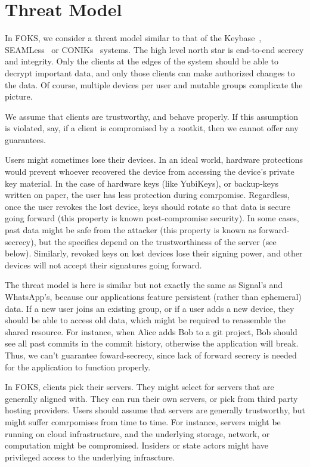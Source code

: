 
\section{Threat Model}
\label{sec:threatmodel}

In FOKS, we consider a threat model similar to that of the Keybase~\cite{keybase},
SEAMLess~\cite{chase2019seemless} or CONIKs~\cite{melara2015coniks} systems.
The high level north star is end-to-end secrecy and integrity. Only the clients
at the edges of the system should be able to decrypt important data, and only
those clients can make authorized changes to the data. Of course, multiple
devices per user and mutable groups complicate the picture.

We assume that clients are trustworthy, and behave properly. If this assumption
is violated, say, if a client is compromised by a rootkit, then we cannot
offer any guarantees. 

Users might sometimes lose their devices. In an ideal world, hardware protections
would prevent whoever recovered the device from accessing the device's private
key material. In the case of hardware keys (like YubiKeys), or backup-keys
written on paper, the user has less protection during comrpomise. Regardless,
once the user revokes the lost device, keys should rotate so that data is secure
going forward (this property is known post-compromise security). In some cases,
past data might be safe from the attacker (this property is known as forward-secrecy),
but the specifics depend on the trustworthiness of the server (see below). Similarly, revoked
keys on lost devices lose their signing power, and other devices will not accept
their signatures going forward.

The threat model is here is similar but not exactly the same as Signal's and
WhatsApp's, because our applications feature persistent (rather than ephemeral)
data. If a new user joins an existing group, or if a user adds a new device,
they should be able to access old data, which might be required to reassemble the
shared resource. For instance, when Alice adds Bob to a git project, Bob
should see all past commits in the commit history, otherwise the
application will break. Thus, we can't guarantee foward-secrecy, since
lack of forward secrecy is needed for the application to function properly.

In FOKS, clients pick their servers. They might select for servers
that are generally aligned with. They can run their own servers, or pick 
from third party hosting providers. Users should assume that servers
are generally trustworthy, but might suffer comrpomises from time to time.
For instance, servers might be running on cloud infrastructure, and the underlying
storage, network, or computation might be compromised. Insiders or state actors
might have privileged access to the underlying infrascture. 

